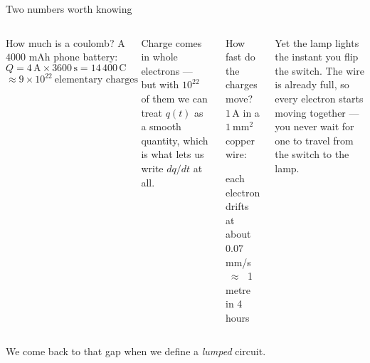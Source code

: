 \documentclass[11pt,aspectratio=169]{beamer}
\newcommand{\Qcol}[1]{\textcolor{ccharge}{#1}}
\newcommand{\uni}[1]{\,\mathrm{#1}}
\newcommand{\A}{\uni{A}} \newcommand{\V}{\uni{V}}
\newcommand{\Cb}{\uni{C}} \newcommand{\s}{\uni{s}}
\begin{document}
\begin{frame}{Two numbers worth knowing}
  \begin{columns}[T,onlytextwidth]
      \begin{block}{How much is a coulomb?}
        A $4000$ mAh phone battery:
        \[ Q = 4\A \times 3600\s = 14\,400\Cb \]
        \[ \approx 9\times10^{22}\ \text{elementary charges} \]
      \end{block}
      \small
      Charge comes in whole electrons --- but with $10^{22}$ of them we can treat
      \Qcol{$q(t)$} as a \alert{smooth} quantity, which is what lets us write $dq/dt$
      at all.
      \begin{block}{How fast do the charges move?}
        $1\A$ in a $1\ \mathrm{mm^2}$ copper wire:
        \begin{center}
          each electron drifts at about\\[3pt]
          \alert{$0.07$ mm/s} $\;\approx\;$ 1 metre in 4 hours
        \end{center}
      \end{block}
      \small
      Yet the lamp lights the instant you flip the switch. The wire is
      \alert{already full}, so every electron starts moving together --- you never wait
      for one to travel from the switch to the lamp.
  \end{columns}
  \vfill
  \begin{center}\small\color{metugray}
    We come back to that gap when we define a \emph{lumped} circuit.
  \end{center}
\end{frame}
\end{document}
